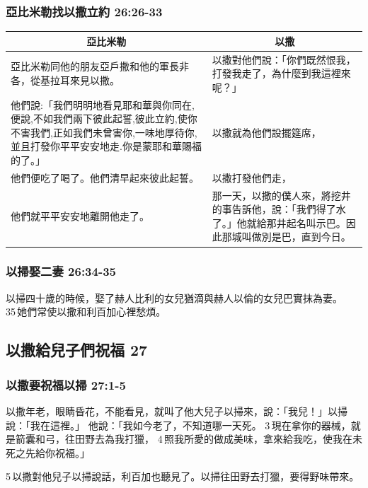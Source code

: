 \subsubsection{亞比米勒找以撒立約 26:26-33 }
\begin{table}[H]
\centering
\begin{tabular}{p{9.75cm}|p{}}\hline\hline
\multicolumn{1}{c|}{亞比米勒}&\multicolumn{1}{c}{以撒}\\\hline
亞比米勒同他的朋友亞戶撒和他的軍長非各，從基拉耳來見以撒。
&以撒對他們說：「你們既然恨我，打發我走了，為什麼到我這裡來呢？」\\\hline
他們說:「我們明明地看見耶和華與你同在,便說,不如我們兩下彼此起誓,彼此立約,使你不害我們,正如我們未曾害你,一味地厚待你,並且打發你平平安安地走.你是蒙耶和華賜福的了。」&以撒就為他們設擺筵席，\\\hline
他們便吃了喝了。他們清早起來彼此起誓。
&以撒打發他們走，\\\hline
他們就平平安安地離開他走了。&那一天，以撒的僕人來，將挖井的事告訴他，說：「我們得了水了。」他就給那井起名叫示巴。因此那城叫做別是巴，直到今日。\\\hline
\end{tabular}
\end{table}




\subsubsection{以掃娶二妻 26:34-35}
\label{sec:YiSauErQi}
以掃四十歲的時候，娶了赫人比利的女兒猶滴與赫人以倫的女兒巴實抹為妻。 35 她們常使以撒和利百加心裡愁煩。
 
\subsection{以撒給兒子們祝福 27}
\label{sec:DeZhangZiZhuFu}

\subsubsection{以撒要祝福以掃 27:1-5}
以撒年老，眼睛昏花，不能看見，就叫了他大兒子以掃來，說：「我兒！」以掃說：「我在這裡。」
他說：「我如今老了，不知道哪一天死。 3 現在拿你的器械，就是箭囊和弓，往田野去為我打獵， 4 照我所愛的做成美味，拿來給我吃，使我在未死之先給你祝福。」

5 以撒對他兒子以掃說話，利百加也聽見了。以掃往田野去打獵，要得野味帶來。

